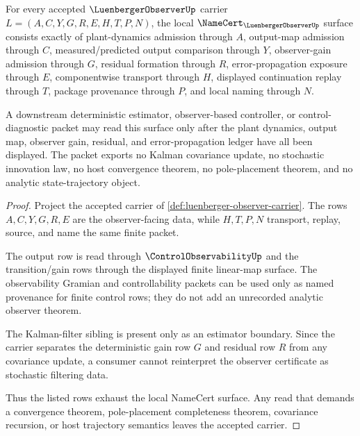 \begin{theorem}
\label{thm:luenberger-observer-namecert-obligations}
For every accepted $\LuenbergerObserverUp$ carrier $L=(A,C,Y,G,R,E,H,T,P,N)$, the local $\NameCert_{\LuenbergerObserverUp}$ surface consists exactly of plant-dynamics admission through $A$, output-map admission through $C$, measured/predicted output comparison through $Y$, observer-gain admission through $G$, residual formation through $R$, error-propagation exposure through $E$, componentwise transport through $H$, displayed continuation replay through $T$, package provenance through $P$, and local naming through $N$.

A downstream deterministic estimator, observer-based controller, or control-diagnostic packet may read this surface only after the plant dynamics, output map, observer gain, residual, and error-propagation ledger have all been displayed. The packet exports no Kalman covariance update, no stochastic innovation law, no host convergence theorem, no pole-placement theorem, and no analytic state-trajectory object.
\end{theorem}

\begin{proof}
Project the accepted carrier of \autoref{def:luenberger-observer-carrier}. The rows $A,C,Y,G,R,E$ are the observer-facing data, while $H,T,P,N$ transport, replay, source, and name the same finite packet.

The output row is read through $\ControlObservabilityUp$ and the transition/gain rows through the displayed finite linear-map surface. The observability Gramian and controllability packets can be used only as named provenance for finite control rows; they do not add an unrecorded analytic observer theorem.

The Kalman-filter sibling is present only as an estimator boundary. Since the carrier separates the deterministic gain row $G$ and residual row $R$ from any covariance update, a consumer cannot reinterpret the observer certificate as stochastic filtering data.

Thus the listed rows exhaust the local NameCert surface. Any read that demands a convergence theorem, pole-placement completeness theorem, covariance recursion, or host trajectory semantics leaves the accepted carrier.
\end{proof}


